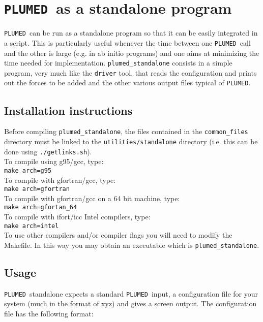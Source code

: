 \documentclass[12pt,fleqn]{report}
\newcommand{\plumed}{{\tt PLUMED}}
\begin{document}
\section{\plumed \ as a standalone program}


\plumed\ can be run as a standalone program so that it can be easily integrated in a script. This is particularly
useful whenever the time between one \plumed \ call and the other is large (e.g. in ab initio programs) and one
aims at minimizing the time needed for implementation. {\tt plumed\_standalone} consists in a simple program, very much like
the  {\tt driver} tool, that reads the configuration and prints out the forces to be added and the other various output files 
typical of \plumed.  

\subsection{Installation instructions}
Before compiling {\tt plumed\_standalone}, the files
contained in the {\tt common\_files} directory must be linked to the
{\tt utilities/standalone} directory (i.e. this can be done using {\tt ./getlinks.sh}).
\vspace {5pt} \\
To compile using g95/gcc, type:
\vspace {5pt} \\
{\tt make arch=g95}
\vspace {5pt}\\
To compile with gfortran/gcc, type:
\vspace {5pt}\\
{\tt make arch=gfortran}
\vspace {5pt}\\
To compile with gfortran/gcc on a 64 bit machine, type:
\vspace {5pt}\\
{\tt make arch=gfortan\_64}
\vspace {5pt}\\
To compile with ifort/icc Intel compilers, type:
\vspace {5pt}\\
{\tt make arch=intel}
\vspace {5pt}\\

To use other compilers and/or compiler flags you will need to modify the Makefile.
In this way you may obtain an executable which is {\tt plumed\_standalone}.

\subsection{Usage}

\plumed\ standalone expects a standard \plumed\ input, a configuration file for your system (much in the format of 
xyz) and gives a screen output.
The configuration file has the following format:
 
\end{document}
